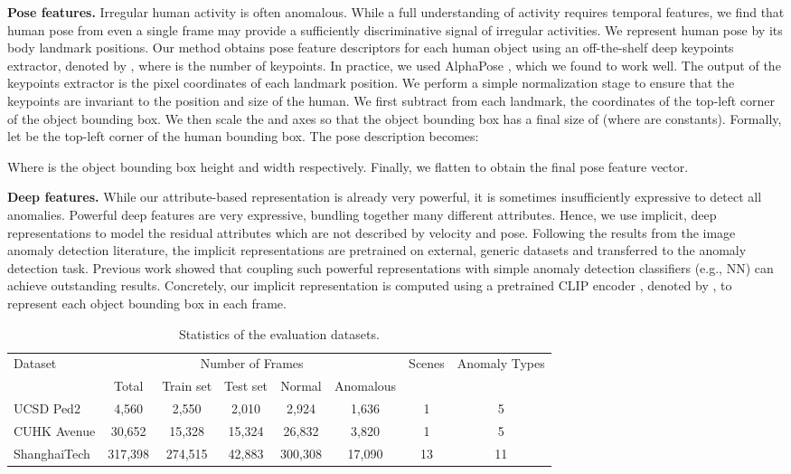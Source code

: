 \documentclass[10pt,twocolumn,letterpaper]{article}
\begin{document}
\textbf{Pose features.} Irregular human activity is often anomalous. While a full understanding of activity requires temporal features, we find that human pose from even a single frame may provide a sufficiently discriminative signal of irregular activities. We represent human pose by its body landmark positions. Our method obtains pose feature descriptors for each human object  using an off-the-shelf deep keypoints extractor, denoted by , where  is the number of keypoints. In practice, we used AlphaPose \cite{alphapose}, which we found to work well. The output of the keypoints extractor is the pixel coordinates of each landmark position. We perform a simple normalization stage to ensure that the keypoints are invariant to the position and size of the human.  We first subtract from each landmark, the coordinates of the top-left corner of the object bounding box. We then scale the  and  axes so that the object bounding box has a final size of  (where  are constants). Formally, let  be the top-left corner of the human bounding box. The pose description becomes:

Where  is the object  bounding box height and width respectively. Finally, we flatten  to obtain the final pose feature vector.

\textbf{Deep features.} While our attribute-based representation is already very powerful, it is sometimes insufficiently expressive to detect all anomalies. Powerful deep features are very expressive, bundling together many different attributes.
Hence, we use implicit, deep representations to model the residual attributes which are not described by velocity and pose.  Following the results from the image anomaly detection literature, the implicit representations are pretrained on external, generic datasets and transferred to the anomaly detection task. Previous work \cite{panda,mean_shifted} showed that coupling such powerful representations with simple anomaly detection classifiers (e.g., NN) can achieve outstanding results. Concretely, our implicit representation is computed using a pretrained CLIP encoder \cite{clip}, denoted by , to represent each object bounding box in each frame.  

\begin{table*}[t]
  \centering
  \begin{tabular}{|l|c|c|c|c|c|c|c|}
    \hline
\multirow{2}{*}{Dataset} & \multicolumn{5}{c|}{Number of Frames}  & \multirow{2}{*}{Scenes} & \multirow{2}{*}{Anomaly Types} \\
\cline{2-6}
& Total & Train set & Test set &  Normal & Anomalous & & \\
\hline
UCSD Ped2 \cite{ped2} & 4,560 & 2,550 & 2,010 & 2,924 & 1,636 & 1 & 5 \\
\hline
CUHK Avenue \cite{avenue} & 30,652 & 15,328 & 15,324 & 26,832 & 3,820 & 1 & 5\\
\hline
ShanghaiTech  \cite{shanghaitech} & 317,398 & 274,515 & 42,883 & 300,308 & 17,090 & 13 & 11\\
    \hline
  \end{tabular}
    \caption{Statistics of the evaluation datasets.}
    \label{tab:statsistics}
\end{table*}
\end{document}
